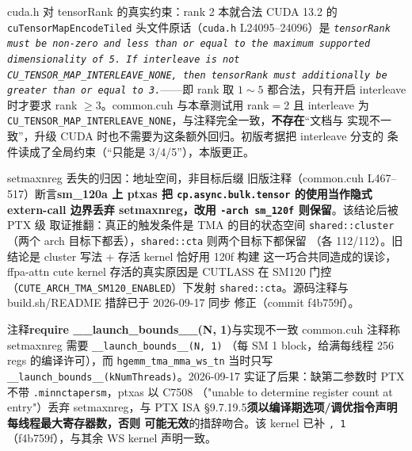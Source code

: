 \begin{kaogu}[F2·API 约束]{cuda.h 对 tensorRank 的真实约束：rank 2 本就合法}
  CUDA 13.2 的 \texttt{cu\allowbreak{}Tensor\allowbreak{}Map\allowbreak{}Encode\allowbreak{}Tiled} 头文件原话（\texttt{cuda.h} L24095--24096）是
  \emph{\texttt{tensorRank must be non-zero and less than or equal to the maximum
  supported dimensionality of 5. If interleave is not
  CU\_TENSOR\_MAP\_INTERLEAVE\_NONE, then tensorRank must additionally be greater
  than or equal to 3.}}——即 rank 取 $1\sim5$ 都合法，只有开启 interleave 时才要求
  rank $\ge 3$。common.cuh 与本章测试用 rank$=$2 且 interleave 为
  \texttt{CU\_TENSOR\_MAP\_INTERLEAVE\_NONE}，与注释完全一致，\textbf{不存在}“文档与
  实现不一致”，升级 CUDA 时也不需要为这条额外回归。初版考据把 interleave 分支的
  条件读成了全局约束（“只能是 3/4/5”），本版更正。
\end{kaogu}

\begin{kaogu}[F1·2026-09-17 修正]{setmaxnreg 丢失的归因：地址空间，非目标后缀}
  旧版注释（common.cuh L467--517）断言\textbf{sm\_120a 上 ptxas 把
  \texttt{cp.\allowbreak{}async.\allowbreak{}bulk.\allowbreak{}tensor} 的使用当作隐式 extern-call 边界丢弃
  setmaxnreg，改用 \texttt{-arch sm\_120f} 则保留}。该结论后被 PTX 级
  取证推翻：真正的触发条件是 TMA 的目的状态空间 \texttt{shared::cluster}
  （两个 arch 目标下都丢），\texttt{shared::cta} 则两个目标下都保留
  （各 112/112）。旧结论是 cluster 写法 + 存活 kernel 恰好用 120f 构建
  这一巧合共同造成的误诊，ffpa-attn cute kernel 存活的真实原因是 CUTLASS
  在 SM120 门控（\texttt{CUTE\_\allowbreak{}ARCH\_\allowbreak{}TMA\_\allowbreak{}SM120\_\allowbreak{}ENABLED}）下发射
  \texttt{shared::cta}。源码注释与 build.sh/README 措辞已于 2026-09-17 同步
  修正（commit f4b759f）。
\end{kaogu}

\begin{kaogu}[F2·已修正]{注释\textbf{require \_\_launch\_bounds\_\_(N, 1)}与实现不一致}
  common.cuh 注释称 setmaxnreg 需要 \texttt{\_\allowbreak{}\_\allowbreak{}launch\_\allowbreak{}bounds\_\allowbreak{}\_\allowbreak{}(N,\allowbreak{} 1)}
  （每 SM 1 block，给满每线程 256 regs 的编译许可），而
  \texttt{hgemm\_\allowbreak{}tma\_\allowbreak{}mma\_\allowbreak{}ws\_\allowbreak{}tn} 当时只写
  \texttt{\_\allowbreak{}\_\allowbreak{}launch\_\allowbreak{}bounds\_\allowbreak{}\_\allowbreak{}\allowbreak{}(k\allowbreak{}Num\allowbreak{}Threads)}。2026-09-17
  实证了后果：缺第二参数时 PTX 不带 \texttt{.minnctapersm}，ptxas 以 C7508
  （"unable to determine register count at entry"）丢弃 setmaxnreg，与
  PTX ISA §9.7.19.5\textbf{须以编译期选项/调优指令声明每线程最大寄存器数，否则
  可能无效}的措辞吻合。该 kernel 已补 \texttt{, 1}（f4b759f），与其余 WS
  kernel 声明一致。
\end{kaogu}


